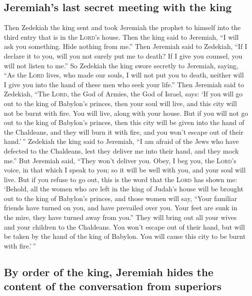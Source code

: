 \hypertarget{jeremiahs-last-secret-meeting-with-the-king}{%
\subsection{Jeremiah's last secret meeting with the
king}\label{jeremiahs-last-secret-meeting-with-the-king}}

 Then Zedekiah the king sent and took Jeremiah the
prophet to himself into the third entry that is in the \textsc{Lord}'s
house. Then the king said to Jeremiah, ``I will ask you something. Hide
nothing from me.''  Then Jeremiah said to Zedekiah, ``If
I declare it to you, will you not surely put me to death? If I give you
counsel, you will not listen to me.''  So Zedekiah the
king swore secretly to Jeremiah, saying, ``As the \textsc{Lord} lives,
who made our souls, I will not put you to death, neither will I give you
into the hand of these men who seek your life.''  Then
Jeremiah said to Zedekiah, ``The \textsc{Lord}, the God of Armies, the
God of Israel, says: `If you will go out to the king of Babylon's
princes, then your soul will live, and this city will not be burnt with
fire. You will live, along with your house.  But if you
will not go out to the king of Babylon's princes, then this city will be
given into the hand of the Chaldeans, and they will burn it with fire,
and you won't escape out of their hand.'\,''  Zedekiah
the king said to Jeremiah, ``I am afraid of the Jews who have defected
to the Chaldeans, lest they deliver me into their hand, and they mock
me.''  But Jeremiah said, ``They won't deliver you. Obey,
I beg you, the \textsc{Lord}'s voice, in that which I speak to you; so
it will be well with you, and your soul will live.  But
if you refuse to go out, this is the word that the \textsc{Lord} has
shown me:  `Behold, all the women who are left in the
king of Judah's house will be brought out to the king of Babylon's
princes, and those women will say, ``Your familiar friends have turned
on you, and have prevailed over you. Your feet are sunk in the mire,
they have turned away from you.''  They will bring out
all your wives and your children to the Chaldeans. You won't escape out
of their hand, but will be taken by the hand of the king of Babylon. You
will cause this city to be burnt with fire.'\,''

\hypertarget{by-order-of-the-king-jeremiah-hides-the-content-of-the-conversation-from-superiors}{%
\subsection{By order of the king, Jeremiah hides the content of the
conversation from
superiors}\label{by-order-of-the-king-jeremiah-hides-the-content-of-the-conversation-from-superiors}}

